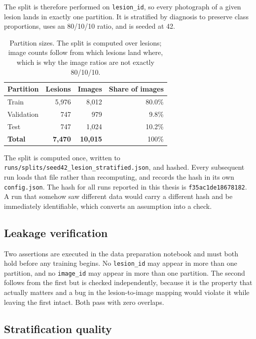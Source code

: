 The split is therefore performed on \texttt{lesion\_id}, so every photograph of a given
lesion lands in exactly one partition. It is stratified by diagnosis to preserve class
proportions, uses an 80/10/10 ratio, and is seeded at 42.

\begin{table}[htbp]
\centering
\caption{Partition sizes. The split is computed over lesions; image counts follow from
which lesions land where, which is why the image ratios are not exactly 80/10/10.}
\label{tab:split-sizes}
\small
\begin{tabular}{@{}lrrr@{}}
\toprule
\textbf{Partition} & \textbf{Lesions} & \textbf{Images} & \textbf{Share of images} \\
\midrule
Train & 5{,}976 & 8{,}012 & 80.0\% \\
Validation &   747 &   979 &  9.8\% \\
Test  &   747 & 1{,}024 & 10.2\% \\
\midrule
\textbf{Total} & \textbf{7{,}470} & \textbf{10{,}015} & 100\% \\
\bottomrule
\end{tabular}
\end{table}

The split is computed once, written to
\texttt{runs/splits/seed42\_lesion\_stratified.json}, and hashed. Every subsequent run
loads that file rather than recomputing, and records the hash in its own
\texttt{config.json}. The hash for all runs reported in this thesis is
\texttt{f35ac1de18678182}. A run that somehow saw different data would carry a different
hash and be immediately identifiable, which converts an assumption into a check.

\subsection{Leakage verification}

Two assertions are executed in the data preparation notebook and must both hold before
any training begins. No \texttt{lesion\_id} may appear in more than one partition, and
no \texttt{image\_id} may appear in more than one partition. The second follows from the
first but is checked independently, because it is the property that actually matters and
a bug in the lesion-to-image mapping would violate it while leaving the first intact.
Both pass with zero overlaps.

\subsection{Stratification quality}

